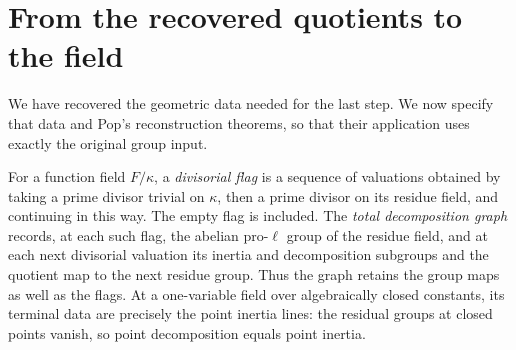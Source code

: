\section{From the recovered quotients to the field}
\label{sec:reconstruction}

We have recovered the geometric data needed for the last step.  We now
specify that data and Pop's reconstruction theorems, so that their
application uses exactly the original group input.

For a function field $F/\kappa$, a \emph{divisorial flag} is a sequence
of valuations obtained by taking a prime divisor trivial on $\kappa$,
then a prime divisor on its residue field, and continuing in this way.
The empty flag is included.  The \emph{total decomposition graph}
records, at each such flag, the abelian pro-$\ell$ group of the residue
field, and at each next divisorial valuation its inertia and
decomposition subgroups and the quotient map to the next residue group.
Thus the graph retains the group maps as well as the flags.  At a
one-variable field over algebraically closed constants, its terminal
data are precisely the point inertia lines: the residual groups at
closed points vanish, so point decomposition equals point inertia.

